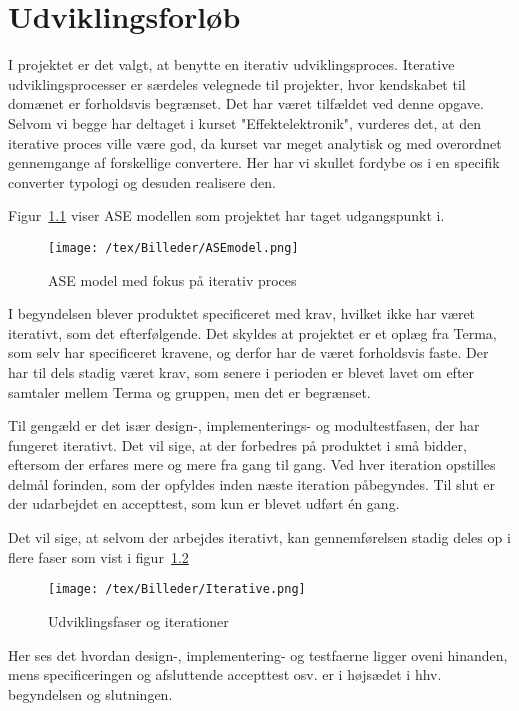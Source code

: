 \chapter{Udviklingsforløb} \label{udvikling}
I projektet er det valgt, at benytte en iterativ udviklingsproces. Iterative udviklingsprocesser er særdeles velegnede til projekter, hvor kendskabet til domænet er forholdsvis begrænset. Det har været tilfældet ved denne opgave. Selvom vi begge har deltaget i kurset "Effektelektronik", vurderes det, at den iterative proces ville være god, da kurset var meget analytisk og med overordnet gennemgange af forskellige convertere. Her har vi skullet fordybe os i en specifik converter typologi og desuden realisere den.


Figur~\ref{fig:ASE} viser ASE modellen som projektet har taget udgangspunkt i. 
\begin{figure}[H]
	\center
	\texttt{[image: /tex/Billeder/ASEmodel.png]}
	\caption{ASE model med fokus på iterativ proces~\cite{udviklingsproces}}
	\label{fig:ASE}
\end{figure} 
I begyndelsen blever produktet specificeret med krav, hvilket ikke har været iterativt, som det efterfølgende. Det skyldes at projektet er et oplæg fra Terma, som selv har specificeret kravene, og derfor har de været forholdsvis faste. Der har til dels stadig været krav, som senere i perioden er blevet lavet om efter samtaler mellem Terma og gruppen, men det er begrænset.

Til gengæld er det især design-, implementerings- og modultestfasen, der har fungeret iterativt. Det vil sige, at der forbedres på produktet i små bidder, eftersom der erfares mere og mere fra gang til gang. Ved hver iteration opstilles delmål forinden, som der opfyldes inden næste iteration påbegyndes. 
Til slut er der udarbejdet en accepttest, som kun er blevet udført én gang.

Det vil sige, at selvom der arbejdes iterativt, kan gennemførelsen stadig deles op i flere faser som vist i figur~\ref{fig:Iterative} 
\begin{figure}[H]
	\center
	\texttt{[image: /tex/Billeder/Iterative.png]}
	\caption{Udviklingsfaser og iterationer~\cite{udviklingsproces}}
	\label{fig:Iterative}
\end{figure} 
Her ses det hvordan design-, implementering- og testfaerne ligger oveni hinanden, mens specificeringen og afsluttende accepttest osv. er i højsædet i hhv. begyndelsen og slutningen.


